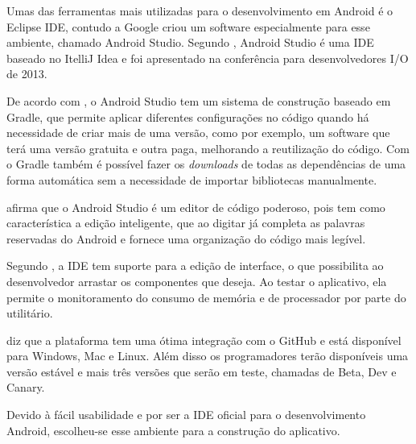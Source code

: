 
	\par Umas das ferramentas mais utilizadas para o desenvolvimento em Android é
o Eclipse IDE, contudo a Google criou um software especialmente para esse
ambiente, chamado Android Studio. Segundo , Android
Studio é uma IDE baseado no ItelliJ Idea e foi apresentado na conferência para
desenvolvedores I/O de {2013}.

	\par De acordo com , o Android Studio tem um
sistema de construção baseado em Gradle, que permite aplicar
diferentes configurações no código quando há necessidade de criar mais de uma
versão, como por exemplo, um software que terá uma versão gratuita e
outra paga, melhorando a reutilização do código. Com o Gradle também é
possível fazer os \textit{downloads} de todas as dependências de uma forma
automática sem a necessidade de importar bibliotecas manualmente.

	\par {} afirma que o Android Studio é um editor
de código poderoso, pois tem como característica a edição inteligente, que ao
digitar já completa as palavras reservadas do Android e fornece uma
organização do código mais legível.

	\par Segundo , a IDE tem suporte para a edição de
interface, o que possibilita ao desenvolvedor arrastar os componentes que
deseja. Ao testar o aplicativo, ela permite o monitoramento do consumo de
memória e de processador por parte do utilitário.

	\par {} diz que a plataforma tem uma ótima integração com
o GitHub e está disponível para Windows, Mac e
Linux. Além disso os programadores terão disponíveis uma versão
estável e mais três versões que serão em teste, chamadas de Beta,
Dev e Canary.

	\par Devido à fácil usabilidade e por ser a IDE oficial para o desenvolvimento
Android, escolheu-se esse ambiente para a construção do aplicativo.